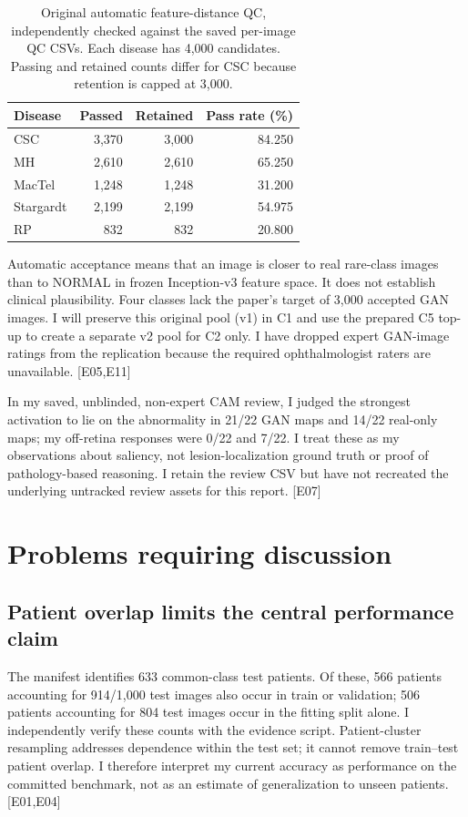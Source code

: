 \documentclass[11pt,a4paper]{article}
\newcommand{\ev}[1]{\textcolor{Link}{\textsf{[#1]}}}
\begin{document}
\begin{table}[htbp]
\centering\small
\caption{Original automatic feature-distance QC, independently checked against
the saved per-image QC CSVs. Each disease has 4,000 candidates. Passing and
retained counts differ for CSC because retention is capped at 3,000.}
\label{tab:qc}
\begin{tabular}{lrrr}
\toprule
Disease & Passed & Retained & Pass rate (\%)\\
\midrule
CSC & 3,370 & 3,000 & 84.250\\
MH & 2,610 & 2,610 & 65.250\\
MacTel & 1,248 & 1,248 & 31.200\\
Stargardt & 2,199 & 2,199 & 54.975\\
RP & 832 & 832 & 20.800\\
\bottomrule
\end{tabular}
\end{table}

Automatic acceptance means that an image is closer to real rare-class images
than to NORMAL in frozen Inception-v3 feature space. It does not establish
clinical plausibility. Four classes lack the paper's target of 3,000 accepted
GAN images. I will preserve this original pool (v1) in C1 and use the prepared
C5 top-up to create a separate v2 pool for C2 only. I have dropped expert
GAN-image ratings from the replication because the required ophthalmologist
raters are unavailable. \ev{E05,E11}

In my saved, unblinded, non-expert CAM review, I judged the strongest activation
to lie on the abnormality in 21/22 GAN maps and 14/22 real-only maps; my off-retina
responses were 0/22 and 7/22. I treat these as my observations about saliency,
not lesion-localization ground truth or proof of pathology-based reasoning.
I retain the review CSV but have not recreated the underlying untracked
review assets for this report. \ev{E07}

\section{Problems requiring discussion}

\subsection{Patient overlap limits the central performance claim}

The manifest identifies 633 common-class test patients. Of these, 566 patients
accounting for 914/1,000 test images also occur in train or validation;
506 patients accounting for 804 test images occur in the fitting split alone.
I independently verify these counts with the evidence script. Patient-cluster
resampling addresses dependence within the test set; it cannot remove
train--test patient overlap. I therefore interpret my current accuracy as
performance on the committed benchmark, not as an estimate of generalization
to unseen patients.
\ev{E01,E04}
\end{document}
